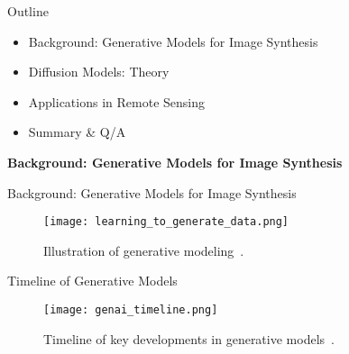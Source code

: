 
\begin{frame}{\LARGE Outline}
  \begin{itemize}
    \item {\Large Background: Generative Models for Image Synthesis}
    \item {\Large Diffusion Models: Theory}
    \item {\Large Applications in Remote Sensing}
    \item {\Large Summary \& Q/A}
  \end{itemize}
\end{frame}


\begin{refsection}
  \begin{frame}
    \centering
    \vspace{2.5cm}
    {\LARGE \textbf{Background: Generative Models for Image Synthesis}}
  \end{frame}
\end{refsection}

\begin{refsection}
  \begin{frame}{Background: Generative Models for Image Synthesis}
    \begin{figure}
      \centering
      \texttt{[image: learning\_to\_generate\_data.png]}
      \caption{\scriptsize Illustration of generative modeling~\parencite{CVPR2023Tutorial}.}
    \end{figure}
    
    \bottomleftrefs
  \end{frame}
\end{refsection}

\begin{refsection}
  \begin{frame}{Timeline of Generative Models}
    \begin{figure}
      \centering
      \texttt{[image: genai\_timeline.png]}
      \caption{\scriptsize Timeline of key developments in generative models~\parencite{dengPPTAdvancedNueralNetwork2024}.}
    \end{figure}
    \bottomleftrefs
  \end{frame}
  \end{refsection}

